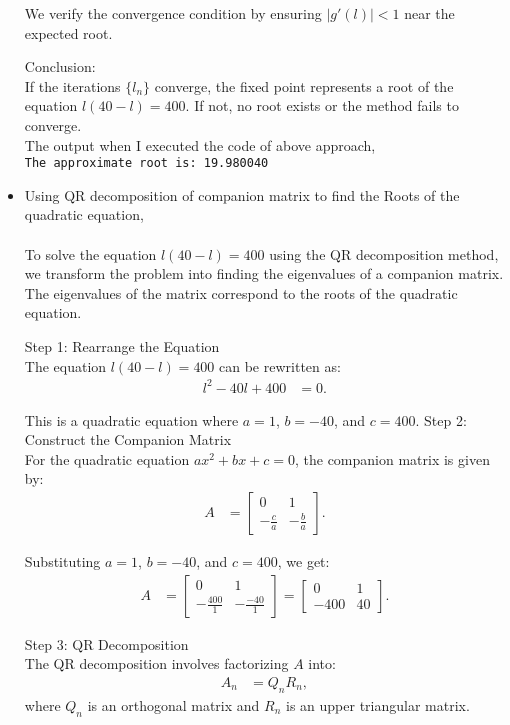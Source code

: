 \documentclass[article]{IEEEtran}
\numberwithin{figure}{enumi}
\begin{document}
\begin{itemize}
We verify the convergence condition by ensuring $\left| g'(l) \right| < 1$ near the expected root.

Conclusion:\\
If the iterations $\{l_n\}$ converge, the fixed point represents a root of the equation $l(40 - l) = 400$. If not, no root exists or the method fails to converge.\\
The output when I  executed the code of above approach,\\
\texttt{The approximate root is: 19.980040}

\newpage

\item Using QR decomposition of companion matrix to find the Roots of the quadratic equation,\\
\\To solve the equation $l(40-l) = 400$ using the QR decomposition method, we transform the problem into finding the eigenvalues of a companion matrix. The eigenvalues of the matrix correspond to the roots of the quadratic equation.

Step 1: Rearrange the Equation\\
The equation $l(40-l) = 400$ can be rewritten as:
\begin{align}
l^2 - 40l + 400 &= 0.
\end{align}

This is a quadratic equation where $a = 1$, $b = -40$, and $c = 400$.
Step 2: Construct the Companion Matrix\\
For the quadratic equation $ax^2 + bx + c = 0$, the companion matrix is given by:
\begin{align}
A &= 
\begin{bmatrix}
0 & 1 \\
-\frac{c}{a} & -\frac{b}{a}
\end{bmatrix}.
\end{align}

Substituting $a = 1$, $b = -40$, and $c = 400$, we get:
\begin{align}
A &= 
\begin{bmatrix}
0 & 1 \\
-\frac{400}{1} & -\frac{-40}{1}
\end{bmatrix} =
\begin{bmatrix}
0 & 1 \\
-400 & 40
\end{bmatrix}.
\end{align}

Step 3: QR Decomposition\\
The QR decomposition involves factorizing $A$ into:
\begin{align}
A_n &= Q_n R_n,
\end{align}
where $Q_n$ is an orthogonal matrix and $R_n$ is an upper triangular matrix.


\end{itemize}
\end{document}
